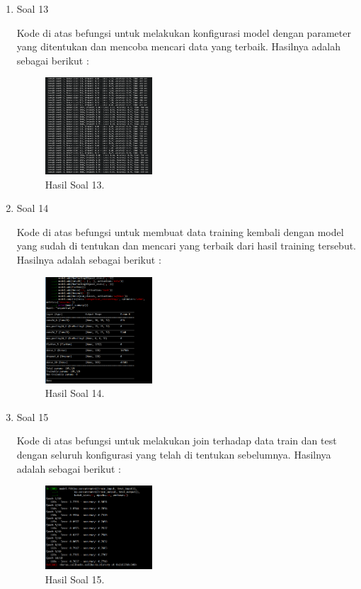 \begin{enumerate}
	\item Soal 13
	\hfill\break
	
	Kode di atas befungsi untuk melakukan konfigurasi model dengan parameter yang ditentukan dan mencoba mencari data yang terbaik. Hasilnya adalah sebagai berikut :  
	\begin{figure}[H]
	\centering
		\includegraphics[width=4cm]{figures/1174080/7/materi/hasil13.PNG}
		\caption{Hasil Soal 13.}
	\end{figure}

	\item Soal 14
	\hfill\break
	
	Kode di atas befungsi untuk membuat data training kembali dengan model yang sudah di tentukan dan mencari yang terbaik dari hasil training tersebut. Hasilnya adalah sebagai berikut :  
	\begin{figure}[H]
	\centering
		\includegraphics[width=4cm]{figures/1174080/7/materi/hasil14.PNG}
		\caption{Hasil Soal 14.}
	\end{figure}

	\item Soal 15
	\hfill\break
	
	Kode di atas befungsi untuk melakukan join terhadap data train dan test dengan seluruh konfigurasi yang telah di tentukan sebelumnya. Hasilnya adalah sebagai berikut :  
	\begin{figure}[H]
	\centering
		\includegraphics[width=4cm]{figures/1174080/7/materi/hasil15.PNG}
		\caption{Hasil Soal 15.}
	\end{figure}


\end{enumerate}
